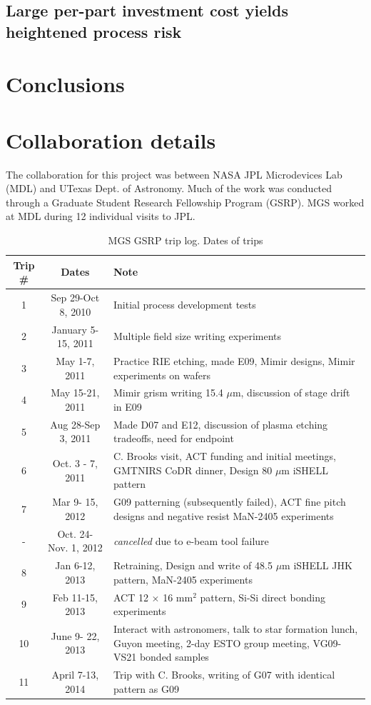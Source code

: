 \documentclass[]{spie}  %
\begin{document}
\subsection{Large per-part investment cost yields heightened process risk}
\section{Conclusions}

\appendix    %
\section{Collaboration details} \label{sec:GSRP}
The collaboration for this project was between NASA JPL Microdevices Lab (MDL) and UTexas Dept. of Astronomy.  Much of the work was conducted through a Graduate Student Research Fellowship Program (GSRP).  MGS worked at MDL during 12 individual visits to JPL.

\begin{table}
	\caption{MGS GSRP trip log.  Dates of trips }
	\begin{tabular}{ccp{8cm}}
	\hline
	 Trip \# &Dates & Note\\
	\hline
	1 & Sep 29-Oct 8, 2010 & Initial process development tests \\
	2 & January 5-15, 2011 & Multiple field size writing experiments\\
	3 & May 1-7, 2011 & Practice RIE etching, made E09, Mimir designs, Mimir experiments on wafers\\	
	4 & May 15-21, 2011 & Mimir grism writing 15.4 $\mu$m, discussion of stage drift in E09  \\	
	5 & Aug 28-Sep 3, 2011 & Made D07 and E12, discussion of plasma etching tradeoffs, need for endpoint\\		
	6 & Oct. 3 - 7, 2011 & C. Brooks visit, ACT funding and initial meetings, GMTNIRS CoDR dinner, Design 80 $\mu$m iSHELL pattern\\
	7 & Mar 9- 15, 2012 & G09 patterning (subsequently failed), ACT fine pitch designs and negative resist MaN-2405 experiments\\
	-  & Oct. 24- Nov. 1, 2012 & \emph{cancelled} due to e-beam tool failure \\
	8 & Jan 6-12, 2013 & Retraining, Design and write of 48.5 $\mu$m iSHELL JHK pattern, MaN-2405 experiments\\
	9 & Feb 11-15, 2013 & ACT 12 $\times$ 16 mm$^2$ pattern, Si-Si direct bonding experiments\\
	10 & June 9- 22, 2013 & Interact with astronomers, talk to star formation lunch, Guyon meeting, 2-day ESTO group meeting, VG09-VS21 bonded samples\\
	11 & April 7-13, 2014 & Trip with C. Brooks, writing of G07 with identical pattern as G09\\
	\hline
	\end{tabular}
\end{table}
\end{document}

